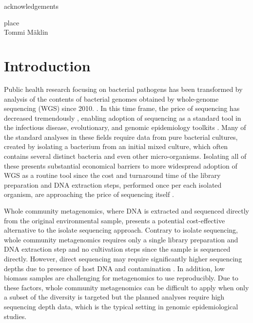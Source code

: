 \documentclass[officiallayout]{tktla}
\begin{document}
\begin{acknowledgements}
  acknowledgements
   \begin{flushright}
  place\\
  Tommi M\"aklin
  \end{flushright}
\end{acknowledgements}

\tableofcontents

\mainmatter

\chapter{Introduction}
\sloppy

Public health research focusing on bacterial pathogens has been
transformed by analysis of the contents of bacterial genomes obtained
by whole-genome sequencing (WGS) since 2010.
\citep{armstrong2019pathogen}. In this time frame, the price of
sequencing has decreased tremendously \citep{dnaseqcost,
  goodwin2016coming}, enabling adoption of sequencing as a standard
tool in the infectious disease, evolutionary, and genomic epidemiology
toolkits \citep{tang2017infection, grad2014epidemiologic,
  kwong2015whole}. Many of the standard analyses in these fields
require data from pure bacterial cultures, created by isolating a
bacterium from an initial mixed culture, which often contains several
distinct bacteria and even other micro-organisms. Isolating all of
these presents substantial economical barriers to more widespread
adoption of WGS as a routine tool since the cost and turnaround time
of the library preparation and DNA extraction steps, performed once
per each isolated organism, are approaching the price of sequencing
itself \citep{rossen2018practical}.

Whole community metagenomics, where DNA is extracted and
sequenced directly from the original environmental sample, presents a
potential cost-effective alternative to the isolate sequencing
approach. Contrary to isolate sequencing, whole community metagenomics requires
only a single library preparation and DNA extraction step and no
cultivation steps since the sample is sequenced directly. However,
direct sequencing may require significantly higher sequencing depths
due to presence of host DNA \citep{pereira2019impact,
  mcardle2020sensitivity} and contamination
\citep{mcardle2020sensitivity, salter2014reagent}. In addition, low
biomass samples are challenging for metagenomics to use
reproducibly. Due to these factors, whole community metagenomics can be difficult
to apply when only a subset of the diversity is targeted but the
planned analyses require high sequencing depth data, which is the
typical setting in genomic epidemiological studies.
\end{document}
